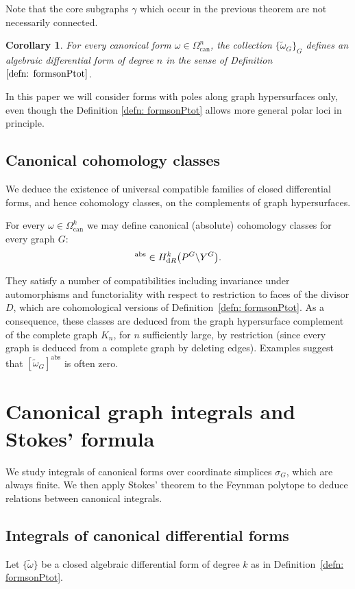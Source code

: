 \documentclass[pdftex]{sigma}%
\newtheorem{cor}[thm]{Corollary}
\numberwithin{equation}{section}
\newcommand{\can}{\mathrm{can}}
\newcommand{\0}{\color{blue}{\mathsf{0}}}
\begin{document}
Note that the core subgraphs $\gamma$ which occur in the previous theorem are not necessarily connected.

\begin{cor} For every canonical form $\omega \in \Omega^{n}_{\can}$, the collection $\{
\widetilde{\omega}_G\}_G$ defines an algebraic differential form of degree $n$ in the sense of Definition~$\ref{defn: formsonPtot}$.
\end{cor}
In this paper we will consider forms with poles along graph hypersurfaces only, even though the Definition \ref{defn: formsonPtot} allows more general polar loci in principle.

\subsection{Canonical cohomology classes} \label{sect: AbsCohomClass}
We deduce the existence of universal compatible families of closed differential forms, and hence cohomology classes, on the complements of graph hypersurfaces.
\begin{defn} For every $\omega \in \Omega^{k}_{\can}$ we may define canonical (absolute) cohomology classes for every graph $G$:
\begin{gather*}
[\widetilde{\omega}_G]^{\mathrm{abs}} \in H_{{\rm d}R}^k\big(P^G \backslash Y^G\big).
\end{gather*}
\end{defn}
They satisfy a number of compatibilities including invariance under automorphisms and functoriality with respect to restriction to faces of the divisor $D$, which are cohomological versions of Definition~\ref{defn: formsonPtot}.
As a consequence, these classes are deduced from the graph hypersurface complement of the complete graph $K_n$, for $n$ sufficiently large, by restriction (since every graph is deduced from a complete graph by deleting edges).
Examples suggest that $[\widetilde{\omega}_G]^{\mathrm{abs}}$ is often zero.


\section{Canonical graph integrals and Stokes' formula}
We study integrals of canonical forms over coordinate simplices $\sigma_G$, which are always finite. We then apply Stokes' theorem to the Feynman polytope to deduce relations between canonical integrals.



\subsection{Integrals of canonical differential forms}
Let $\{\widetilde{\omega}\}$ be a closed algebraic differential form of degree $k$ as in Definition~\ref{defn: formsonPtot}.
\end{document}
